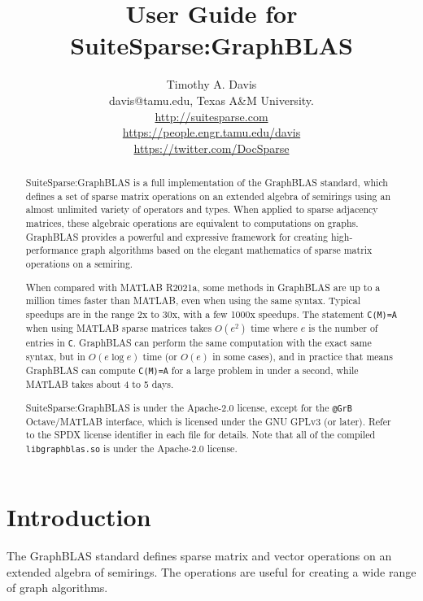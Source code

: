 \documentclass[12pt]{article}
\title{User Guide for SuiteSparse:GraphBLAS}
\author{Timothy A. Davis \\
\small
davis@tamu.edu, Texas A\&M University. \\
\small
\url{http://suitesparse.com} \\
\small
\url{https://people.engr.tamu.edu/davis} \\
\small
\url{https://twitter.com/DocSparse}
}
\begin{document}
\maketitle

\begin{abstract}
SuiteSparse:GraphBLAS is a full implementation of the GraphBLAS standard,
which defines a set of sparse matrix operations on an extended algebra of
semirings using an almost unlimited variety of operators and types.  When
applied to sparse adjacency matrices, these algebraic operations are equivalent
to computations on graphs.  GraphBLAS provides a powerful and expressive
framework for creating high-performance graph algorithms based on the elegant
mathematics of sparse matrix operations on a semiring.

When compared with MATLAB R2021a, some methods in GraphBLAS are up to
a million times faster than MATLAB, even when using the same syntax.
Typical speedups are in the range 2x to 30x, with a few 1000x speedups.
The statement \verb'C(M)=A' when using MATLAB sparse matrices takes
$O(e^2)$ time where $e$ is the number of entries in \verb'C'.  GraphBLAS
can perform the same computation with the exact same syntax, but
in $O(e \log e)$ time (or $O(e)$ in some cases), and in practice that
means GraphBLAS can compute \verb'C(M)=A' for a large problem in under
a second, while MATLAB takes about 4 to 5 days.

SuiteSparse:GraphBLAS is under the Apache-2.0 license, except for the
\verb'@GrB' Octave/MATLAB interface, which is licensed under the GNU GPLv3 (or
later).  Refer to the SPDX license identifier in each file for details.  Note
that all of the compiled \verb'libgraphblas.so' is under the Apache-2.0
license.

\end{abstract}

\newpage
{\small
\tableofcontents
}

\newpage
\section{Introduction} %
\label{intro}

The GraphBLAS standard defines sparse matrix and vector operations on an
extended algebra of semirings.  The operations are useful for creating a wide
range of graph algorithms.
\end{document}
